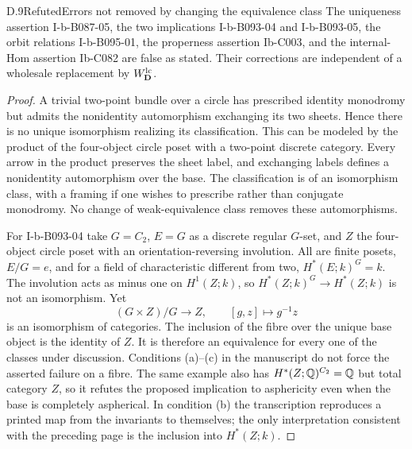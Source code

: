 \begin{claim}{D.9}{Refuted}{Errors not removed by changing the equivalence class}
The uniqueness assertion I-b-B087-05, the two implications I-b-B093-04 and I-b-B093-05, the orbit relations I-b-B095-01, the properness assertion Ib-C003, and the internal-Hom assertion Ib-C082 are false as stated. Their corrections are independent of a wholesale replacement by $W^{\mathrm{lc}}_{\mathbf D}$.
\end{claim}
\begin{proof}
A trivial two-point bundle over a circle has prescribed identity monodromy but admits the nonidentity automorphism exchanging its two sheets. Hence there is no unique isomorphism realizing its classification. This can be modeled by the product of the four-object circle poset with a two-point discrete category. Every arrow in the product preserves the sheet label, and exchanging labels defines a nonidentity automorphism over the base. The classification is of an isomorphism class, with a framing if one wishes to prescribe rather than conjugate monodromy. No change of weak-equivalence class removes these automorphisms.

For I-b-B093-04 take $G=C_2$, $E=G$ as a discrete regular $G$-set, and $Z$ the four-object circle poset with an orientation-reversing involution. All are finite posets, $E/G=e$, and for a field of characteristic different from two, $H^*(E;k)^G=k$. The involution acts as minus one on $H^1(Z;k)$, so $H^*(Z;k)^G\to H^*(Z;k)$ is not an isomorphism. Yet
\[
 (G\times Z)/G\longrightarrow Z,\qquad [g,z]\longmapsto g^{-1}z
\]
is an isomorphism of categories. The inclusion of the fibre over the unique base object is the identity of $Z$. It is therefore an equivalence for every one of the classes under discussion. Conditions (a)--(c) in the manuscript do not force the asserted failure on a fibre. The same example also has $H^*(Z;\mathbb Q)^{C_2}=\mathbb Q$ but total category $Z$, so it refutes the proposed implication to asphericity even when the base is completely aspherical. In condition (b) the transcription reproduces a printed map from the invariants to themselves; the only interpretation consistent with the preceding page is the inclusion into $H^*(Z;k)$.


\end{proof}

